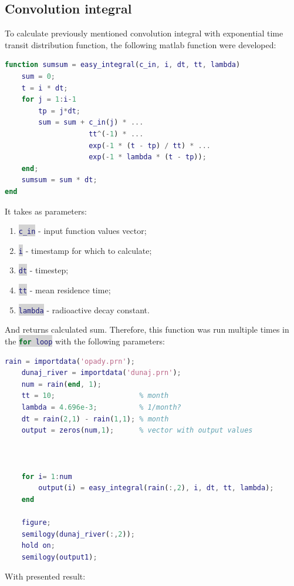 \documentclass[onecolumn]{article}
\newcommand{\inlinecode}[2]{\colorbox{lightgray}{\lstinline[language=#1]$#2$}}
\begin{document}
\subsection{Convolution integral}
To calculate previously mentioned convolution integral with exponential time transit distribution function, the following matlab function were developed:
\begin{lstlisting}[language=Matlab,frame=single,label={lst:autocorr},breaklines=true,caption={Convolutional integral implementation with exponential transit function}]
function sumsum = easy_integral(c_in, i, dt, tt, lambda)
    sum = 0;
    t = i * dt;
    for j = 1:i-1
        tp = j*dt;
        sum = sum + c_in(j) * ...
                    tt^(-1) * ...
                    exp(-1 * (t - tp) / tt) * ... 
                    exp(-1 * lambda * (t - tp));
    end;
    sumsum = sum * dt;
end
\end{lstlisting}
It takes as parameters:
\begin{enumerate}
	\item \inlinecode{matlab}{c_in} -  input function values vector;
    \item \inlinecode{matlab}{i} - timestamp for which to calculate;
    \item \inlinecode{matlab}{dt} - timestep;
    \item \inlinecode{matlab}{tt} - mean residence time;
    \item \inlinecode{matlab}{lambda} - radioactive decay constant.
\end{enumerate}
And returns calculated sum. Therefore, this function was run multiple times in the \inlinecode{matlab}{for loop} with the following parameters:
\begin{lstlisting}[language=Matlab,frame=single,label={lst:autocorr},breaklines=true,caption={Convolutional integral implementation with exponential transit function}]
    rain = importdata('opady.prn');
    dunaj_river = importdata('dunaj.prn');
    num = rain(end, 1);
    tt = 10;                    % month
    lambda = 4.696e-3;          % 1/month?
    dt = rain(2,1) - rain(1,1); % month
    output = zeros(num,1);      % vector with output values



    for i= 1:num
        output(i) = easy_integral(rain(:,2), i, dt, tt, lambda);
    end
    
    figure;
    semilogy(dunaj_river(:,2));
    hold on;
    semilogy(output1);
\end{lstlisting}
With presented result: \\
\end{document}
